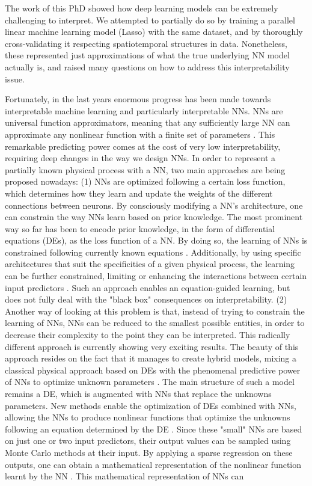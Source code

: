 The work of this PhD showed how deep learning models can be extremely challenging to interpret. We attempted to partially do so by training a parallel linear machine learning model (Lasso) with the same dataset, and by thoroughly cross-validating it respecting spatiotemporal structures in data. Nonetheless, these represented just approximations of what the true underlying NN model actually is, and raised many questions on how to address this interpretability issue. 

Fortunately, in the last years enormous progress has been made towards interpretable machine learning and particularly interpretable NNs. NNs are universal function approximators, meaning that any sufficiently large NN can approximate any nonlinear function with a finite set of parameters \citep{winkler_performance_2017}. This remarkable predicting power comes at the cost of very low interpretability, requiring deep changes in the way we design NNs. In order to represent a partially known physical process with a NN, two main approaches are being proposed nowadays: (1) NNs are optimized following a certain loss function, which determines how they learn and update the weights of the different connections between neurons. By consciously modifying a NN's architecture, one can constrain the way NNs learn based on prior knowledge. The most prominent way so far has been to encode prior knowledge, in the form of differential equations (DEs), as the loss function of a NN. By doing so, the learning of NNs is constrained following currently known equations \citep{raissi_physics_2017,karpatne_physics-guided_2018}. Additionally, by using specific architectures that suit the specificities of a given physical process, the learning can be further constrained, limiting or enhancing the interactions between certain input predictors \citep{karpatne_theory-guided_2017}. Such an approach enables an equation-guided learning, but does not fully deal with the "black box" consequences on interpretability. (2) Another way of looking at this problem is that, instead of trying to constrain the learning of NNs, NNs can be reduced to the smallest possible entities, in order to decrease their complexity to the point they can be interpreted. This radically different approach is currently showing very exciting results. The beauty of this approach resides on the fact that it manages to create hybrid models, mixing a classical physical approach based on DEs with the phenomenal predictive power of NNs to optimize unknown parameters \citep{rackauckas_universal_2020}. The main structure of such a model remains a DE, which is augmented with NNs that replace the unknowns parameters. New methods enable the optimization of DEs combined with NNs, allowing the NNs to produce nonlinear functions that optimize the unknowns following an equation determined by the DE \citep{raissi_physics_2017,rackauckas_universal_2020,bradbury_jax_2020}. Since these "small" NNs are based on just one or two input predictors, their output values can be sampled using Monte Carlo methods at their input. By applying a sparse regression on these outputs, one can obtain a mathematical representation of the nonlinear function learnt by the NN \citep{brunton_discovering_2016}. This mathematical representation of NNs can 